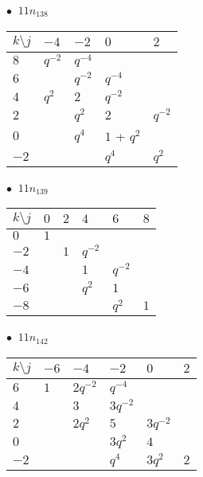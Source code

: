 %
\begin{minipage}{\linewidth}
$\bullet\ $ $11n_{138}$ \vspace{0.5em} \\
\begin{tabular}{l|llll}
$k \setminus j$ & $-4$ & $-2$ & $0$ & $2$ \\
\hline
$8$ & $q^{-2}$ & $q^{-4}$ &  &  \\
$6$ &  & $q^{-2}$ & $q^{-4}$ &  \\
$4$ & $q^{2}$ & $2$ & $q^{-2}$ &  \\
$2$ &  & $q^{2}$ & $2$ & $q^{-2}$ \\
$0$ &  & $q^{4}$ & $1$ + $q^{2}$ &  \\
$-2$ &  &  & $q^{4}$ & $q^{2}$ \\
\end{tabular}
\vspace{2em}
\end{minipage}
%
\begin{minipage}{\linewidth}
$\bullet\ $ $11n_{139}$ \vspace{0.5em} \\
\begin{tabular}{l|lllll}
$k \setminus j$ & $0$ & $2$ & $4$ & $6$ & $8$ \\
\hline
$0$ & $1$ &  &  &  &  \\
$-2$ &  & $1$ & $q^{-2}$ &  &  \\
$-4$ &  &  & $1$ & $q^{-2}$ &  \\
$-6$ &  &  & $q^{2}$ & $1$ &  \\
$-8$ &  &  &  & $q^{2}$ & $1$ \\
\end{tabular}
\vspace{2em}
\end{minipage}
%
\begin{minipage}{\linewidth}
$\bullet\ $ $11n_{142}$ \vspace{0.5em} \\
\begin{tabular}{l|lllll}
$k \setminus j$ & $-6$ & $-4$ & $-2$ & $0$ & $2$ \\
\hline
$6$ & $1$ & $2q^{-2}$ & $q^{-4}$ &  &  \\
$4$ &  & $3$ & $3q^{-2}$ &  &  \\
$2$ &  & $2q^{2}$ & $5$ & $3q^{-2}$ &  \\
$0$ &  &  & $3q^{2}$ & $4$ &  \\
$-2$ &  &  & $q^{4}$ & $3q^{2}$ & $2$ \\
\end{tabular}
\vspace{2em}
\end{minipage}

